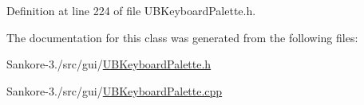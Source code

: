 Definition at line 224 of file U\-B\-Keyboard\-Palette.\-h.



The documentation for this class was generated from the following files\-:\begin{DoxyCompactItemize}
\item 
Sankore-\/3./src/gui/\hyperlink{_u_b_keyboard_palette_8h}{U\-B\-Keyboard\-Palette.\-h}\item 
Sankore-\/3./src/gui/\hyperlink{_u_b_keyboard_palette_8cpp}{U\-B\-Keyboard\-Palette.\-cpp}\end{DoxyCompactItemize}
